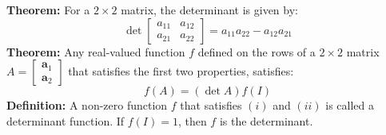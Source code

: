 \documentclass{article}
\newcommand{\bff}[1]{\mathbf{#1}}
\begin{document}
\begin{minipage}[t]{.45\linewidth}
        \textbf{Theorem:} For a $2\times 2$ matrix, the determinant is given by:
        \begin{equation*}
            \det \begin{bmatrix}
                a_{11} & a_{12} \\ 
                a_{21} & a_{22} 
            \end{bmatrix} = a_{11}a_{22} - a_{12}a_{21}
        \end{equation*}
        \textbf{Theorem:} Any real-valued function $f$ defined on the rows of a $2\times 2$ matrix $A = \begin{bmatrix}
            \bff{a}_1 \\ \bff{a}_2
        \end{bmatrix}$ that satisfies the first two properties, satisfies:
        \begin{equation*}
            f(A) = (\det A)f(I)
        \end{equation*}
        \textbf{Definition:} A non-zero function $f$ that satisfies $(i)$ and $(ii)$ is called a determinant function. If $f(I)=1$, then $f$ is the determinant.
    \end{minipage}
    \newpage
\end{document}
